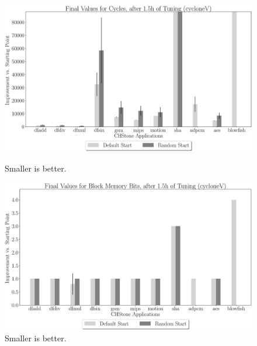 \documentclass[12pt, a4paper]{article}
\begin{document}
\begin{figure}[htpb]
    \begin{minipage}{.48\textwidth}
        \centering
        \includegraphics[width=.8\textwidth]{abs_comp_cycles_5400_chstone_cycloneV}
        \caption{Smaller is better.}
    \end{minipage}%
    \begin{minipage}{.48\textwidth}
        \centering
        \includegraphics[width=.8\textwidth]{abs_comp_block_5400_chstone_cycloneV}
        \caption{Smaller is better.}
    \end{minipage}%
\end{figure}
\end{document}
